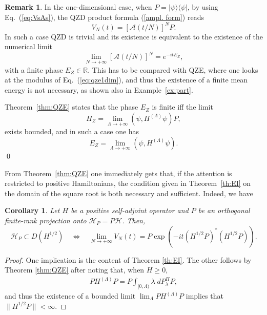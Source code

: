 \documentclass[aip,jmp,12pt
]{revtex4}
\newcommand{\RM}{\mathbb{R}}
\newtheorem{corollary}{Corollary}
\theoremstyle{definition}
\newtheorem{remark}{Remark}
\begin{document}
\begin{remark}
 In the one-dimensional case, when $P=|\psi\rangle\langle\psi|$, by using Eq.~(\ref{eq:VsAs}), the QZD product formula (\ref{ampl. form}) reads
\begin{equation*}
V_N(t)=[\mathcal{A}(t/N)]^N P.
\end{equation*}
In such a case QZD is trivial and its existence is equivalent to the existence of the numerical limit
\begin{equation}
\lim_{N\to+\infty} [\mathcal{A}(t/N)]^N = e^{-i t E_Z},
\label{eq:qze1dim}
\end{equation}
with a finite phase $E_Z \in \RM$. This has to be compared with  QZE, where one looks at the modulus of Eq.~(\ref{eq:qze1dim}), and thus the existence of a finite mean energy is not necessary, as shown also in Example~\ref{ex:part}.


Theorem~\ref {thm:QZE} states that the phase $E_Z$ is finite iff the limit
\begin{equation*}
H_Z = \lim_{\Lambda\to+\infty} (\psi,H^{(\Lambda)}\psi) P,
\end{equation*}
exists bounded, and in such a case one has
\begin{equation*}
E_Z = \lim_{\Lambda\to+\infty} (\psi,H^{(\Lambda)}\psi).
\end{equation*}
\qed
\end{remark}

From Theorem~\ref {thm:QZE} one immediately gets that, if the attention is restricted to  positive Hamiltonians, the condition given in Theorem~\ref{th:EI}  on the domain of the square root is both necessary and sufficient. Indeed, we have
\begin{corollary}\label{cor:QZE}
Let  $H$ be a
positive self-adjoint operator 
and $P$ be an orthogonal finite-rank projection onto $\mathcal{H}_{P}=P\mathcal{H}$.
Then,
\[
\mathcal{H}_{P} \subset D(H^{1/2})\quad \Leftrightarrow \quad  \lim_{N \to +\infty} V_{N}(t)= P\exp\left(-it(H^{1/2}P)^{*}(H^{1/2}P)\right) .
\]
\end{corollary}
\begin{proof}

One implication is the content of Theorem \ref{th:EI}. The other follows by Theorem \ref{thm:QZE} after noting that, when $H\geq 0$,
\begin{eqnarray*}
P H^{(\Lambda)} P= P \int_{[0,\Lambda)} \lambda\; dP_\lambda^H P,
\end{eqnarray*}
and thus the existence of a bounded limit  $\lim_{\Lambda} P H^{(\Lambda)} P$ implies that $\| H^{1/2}P\|<\infty$.
\end{proof}
\end{document}
